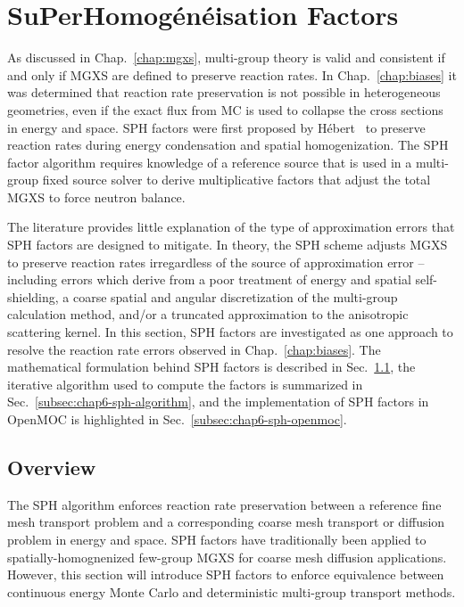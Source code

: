 \section{SuPerHomog\'{e}n\'{e}isation Factors}
\label{sec:chap6-sph}

As discussed in Chap.~\ref{chap:mgxs}, multi-group theory is valid and consistent if and only if \ac{MGXS} are defined to preserve reaction rates. In Chap.~\ref{chap:biases} it was determined that reaction rate preservation is not possible in heterogeneous geometries, even if the exact flux from \ac{MC} is used to collapse the cross sections in energy and space. \ac{SPH} factors were first proposed by H\'{e}bert~\cite{hebert1993consistent} to preserve reaction rates during energy condensation and spatial homogenization. The \ac{SPH} factor algorithm requires knowledge of a reference source that is used in a multi-group fixed source solver to derive multiplicative factors that adjust the total \ac{MGXS} to force neutron balance. 

The literature provides little explanation of the type of approximation errors that \ac{SPH} factors are designed to mitigate. In theory, the \ac{SPH} scheme adjusts \ac{MGXS} to preserve reaction rates irregardless of the source of approximation error -- including errors which derive from a poor treatment of energy and spatial self-shielding, a coarse spatial and angular discretization of the multi-group calculation method, and/or a truncated approximation to the anisotropic scattering kernel. In this section, \ac{SPH} factors are investigated as one approach to resolve the reaction rate errors observed in Chap.~\ref{chap:biases}. The mathematical formulation behind \ac{SPH} factors is described in Sec.~\ref{subsec:chap6-sph-overview}, the iterative algorithm used to compute the factors is summarized in Sec.~\ref{subsec:chap6-sph-algorithm}, and the implementation of \ac{SPH} factors in OpenMOC is highlighted in Sec.~\ref{subsec:chap6-sph-openmoc}.

\subsection{Overview}
\label{subsec:chap6-sph-overview}

The \ac{SPH} algorithm enforces reaction rate preservation between a reference fine mesh transport problem and a corresponding coarse mesh transport or diffusion problem in energy and space. \ac{SPH} factors have traditionally been applied to spatially-homognenized few-group \ac{MGXS} for coarse mesh diffusion applications. However, this section will introduce \ac{SPH} factors to enforce equivalence between continuous energy Monte Carlo and deterministic multi-group transport methods. 

